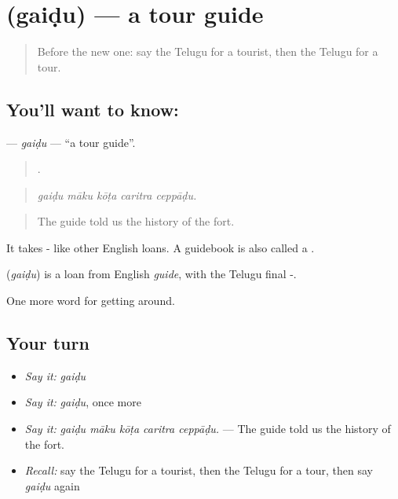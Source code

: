 \section[\texorpdfstring{\te{గైడు} (gaiḍu)}{గైడు (gaiḍu)}]{ (gaiḍu) — a tour guide}

\label{lesson:TE-C455-gaidu}



\begin{quote}
Before the new one: say the Telugu for a tourist, then the Telugu for a tour.
\end{quote}

\subsection*{You'll want to know: }
\textbf{} — \emph{gaiḍu} — \textquotedblleft{}a tour guide\textquotedblright{}.

\begin{quote}
    .
\end{quote}

\begin{quote}
\emph{gaiḍu māku kōṭa caritra ceppāḍu.}
\end{quote}

\begin{quote}
The guide told us the history of the fort.
\end{quote}

It takes - like other English loans. A guidebook is also called a .

\begin{cousinweb}
\textbf{} (\emph{gaiḍu}) is a loan from English \emph{guide}, with the Telugu final -.
\end{cousinweb}

\begin{grammarlens}[title={What you've built}]
One more word for getting around.
\end{grammarlens}

\subsection*{Your turn}
\begin{itemize}
\raggedright
  \item \emph{Say it:} \emph{gaiḍu}
  \item \emph{Say it:} \emph{gaiḍu}, once more
  \item \emph{Say it:} \emph{gaiḍu māku kōṭa caritra ceppāḍu.} — The guide told us the history of the fort.
  \item \emph{Recall:} say the Telugu for a tourist, then the Telugu for a tour, then say \emph{gaiḍu} again
\end{itemize}

